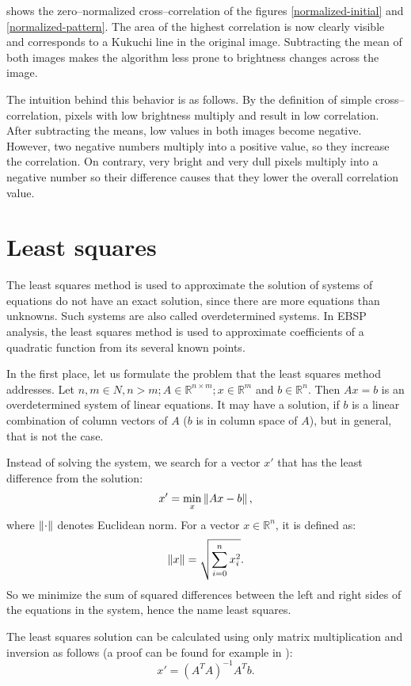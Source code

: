  shows the zero--normalized cross--correlation of the figures \ref{normalized-initial} and \ref{normalized-pattern}. The area of the highest correlation is now clearly visible and corresponds to a Kukuchi line in the original image. Subtracting the mean of both images makes the algorithm less prone to brightness changes across the image.



The intuition behind this behavior is as follows. By the definition of simple cross--correlation, pixels with low brightness multiply and result in low correlation. After subtracting the means, low values in both images become negative. However, two negative numbers multiply into a positive value, so they increase the correlation. On contrary, very bright and very dull pixels multiply into a negative number so their difference causes that they lower the overall correlation value.

\section{Least squares}

The least squares method is used to approximate the solution of systems of equations do not have an exact solution, since there are more equations than unknowns. Such systems are also called overdetermined systems. In EBSP analysis, the least squares method is used to approximate coefficients of a quadratic function from its several known points.

In the first place, let us formulate the problem that the least squares method addresses. Let $n,m \in N, n > m; A \in \mathbb{R}^{n \times m}; x \in \mathbb{R}^m$ and $b \in \mathbb{R}^n$. Then $Ax = b$ is an overdetermined system of linear equations. It may have a solution, if $b$ is a linear combination of column vectors of $A$ ($b$ is in column space of $A$), but in general, that is not the case.

Instead of solving the system, we search for a vector $x'$ that has the least difference from the solution:
\[
x' = \min_x \left\lVert Ax - b\right\rVert,
\]
where $\left\lVert\cdot\right\rVert$ denotes Euclidean norm. For a vector $x \in \mathbb{R}^n$, it is defined as:
\[
\left\lVert x\right\rVert = \sqrt{\sum_{i=0}^{n} x_i^2}.
\]
So we minimize the sum of squared differences between the left and right sides of the equations in the system, hence the name least squares.

The least squares solution can be calculated using only matrix multiplication and inversion as follows (a proof can be found for example in \cite{anton2013elementary}):  
\[
x' = (A^TA)^{-1}A^Tb.
\]

